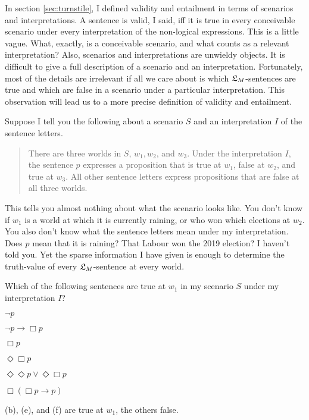 In section \ref{sec:turnstile}, I defined validity and entailment in terms of
scenarios and interpretations. A sentence is valid, I said, iff it is true in
every conceivable scenario under every interpretation of the non-logical
expressions. This is a little vague. What, exactly, is a conceivable scenario,
and what counts as a relevant interpretation? Also, scenarios and
interpretations are unwieldy objects. It is difficult to give a full description
of a scenario and an interpretation. Fortunately, most of the details are
irrelevant if all we care about is which $\mathfrak{L}_{M}$-sentences are true and which
are false in a scenario under a particular interpretation. This observation will
lead us to a more precise definition of validity and entailment.

Suppose I tell you the following about a scenario $S$ and an interpretation $I$
of the sentence letters.

\begin{quote}
  There are three worlds in $S$, $w_{1}, w_{2}$, and $w_{3}$. Under the
  interpretation $I$, the sentence $p$ expresses a proposition that is true at
  $w_{1}$, false at $w_{2}$, and true at $w_{3}$. All other sentence letters
  express propositions that are false at all three worlds.
\end{quote}

This tells you almost nothing about what the scenario looks like. You don't know
if $w_{1}$ is a world at which it is currently raining, or who won which
elections at $w_{2}$. You also don't know what the sentence letters mean under
my interpretation. Does $p$ mean that it is raining? That Labour won the
2019 election? I haven't told you. Yet the sparse information I have given is
enough to determine the truth-value of every $\mathfrak{L}_{M}$-sentence at every world.

\begin{exercise}
  Which of the following sentences are true at $w_{1}$ in my scenario $S$ under
  my interpretation $I$?
  \begin{exlist}
  \item $\neg p$ %
  \item $\neg p \to \Box p$ %
  \item $\Box p$ %
  \item $\Diamond\Box p$ %
  \item $\Diamond \Diamond p \lor \Diamond \Box p$ %
  \item $\Box (\Box p \to p)$ %
  \end{exlist}
\end{exercise}
\begin{solution}
  (b), (e), and (f) are true at $w_{1}$, the others false.
\end{solution}

